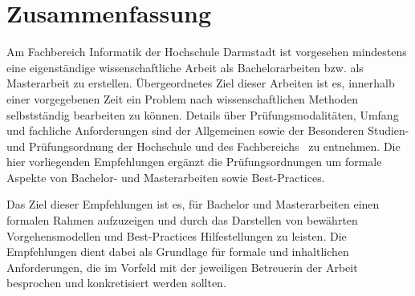 \section*{Zusammenfassung}\label{sec:zusammenfassung}
%
Am Fachbereich Informatik der Hochschule Darmstadt ist vorgesehen mindestens eine eigenständige wissenschaftliche Arbeit als Bachelorarbeiten bzw. als Masterarbeit zu erstellen. Übergeordnetes Ziel dieser Arbeiten ist es, innerhalb einer vorgegebenen Zeit ein Problem nach wissenschaftlichen Methoden selbstständig bearbeiten zu können. Details über Prüfungsmodalitäten, Umfang und fachliche Anforderungen sind der Allgemeinen sowie der Besonderen Studien- und Prüfungsordnung der Hochschule und des Fachbereichs~\cite{} zu entnehmen. Die hier vorliegenden Empfehlungen ergänzt die Prüfungsordnungen um formale Aspekte von Bachelor- und Masterarbeiten sowie Best-Practices.
\smallskip

Das Ziel dieser Empfehlungen ist es, für Bachelor und Masterarbeiten einen formalen Rahmen aufzuzeigen und durch das Darstellen von bewährten Vorgehensmodellen und Best-Practices Hilfestellungen zu leisten. Die Empfehlungen dient dabei als Grundlage für formale und inhaltlichen Anforderungen, die im Vorfeld mit der jeweiligen Betreuerin der Arbeit besprochen und konkretisiert werden sollten.
